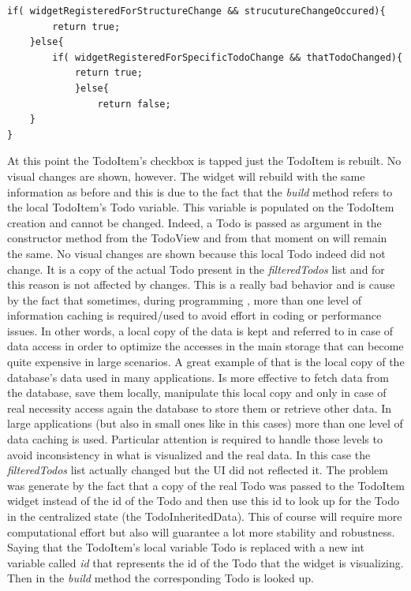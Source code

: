 \begin{verbatim}
if( widgetRegisteredForStructureChange && strucutureChangeOccured){
        return true;
    }else{
        if( widgetRegisteredForSpecificTodoChange && thatTodoChanged){
            return true;
            }else{
                return false;
    }
}
\end{verbatim}


At this point the TodoItem’s checkbox is tapped just the TodoItem is rebuilt. No visual changes are shown, however. The widget will rebuild with the same information as before and this is due to the fact that the \textit{build} method refers to the local TodoItem's Todo variable. This variable is populated on the TodoItem creation and cannot be changed. Indeed, a Todo is passed as argument in the constructor method from the TodoView and from that moment on will remain the same. No visual changes are shown because this local Todo indeed did not change. It is a copy of the actual Todo present in the \textit{filteredTodos} list and for this reason is not affected by changes. This is a really bad behavior and is cause by the fact that sometimes, during programming , more than one level of information caching is required/used to avoid effort in coding or performance issues. In other words, a local copy of the data is kept and referred to in case of data access in order to optimize the accesses in the main storage that can become quite expensive in large scenarios. A great example of that is the local copy of the database’s data used in many applications. Is more effective to fetch data from the database, save them locally, manipulate this local copy and only in case of real necessity access again the database to store them or retrieve other data. In large applications (but also in small ones like in this cases) more than one level of data caching is used. Particular attention is required to handle those levels to avoid inconsistency in what is visualized and the real data. In this case the \textit{filteredTodos} list actually changed but the UI did not reflected it. The problem was generate by the fact that a copy of the real Todo was passed to the TodoItem widget instead of the id of the Todo and then use this id to look up for the Todo in the centralized state (the TodoInheritedData). This of course will require more computational effort but also will guarantee a lot more stability and robustness. 
Saying that the TodoItem’s local variable Todo is replaced with a new int variable called \textit{id} that represents the id of the Todo that the widget is visualizing. Then in the \textit{build} method the corresponding Todo is looked up.



